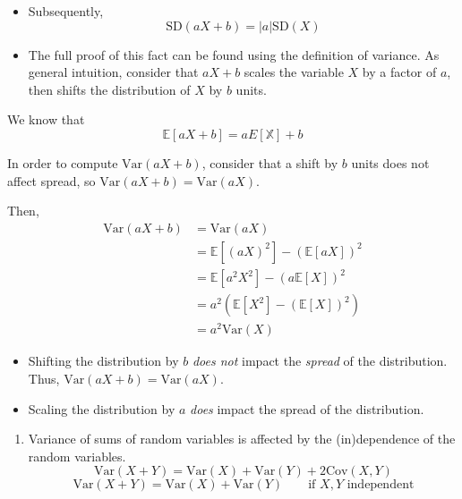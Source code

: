 \documentclass[
  letterpaper,
  DIV=11,
  numbers=noendperiod]{scrreprt}
\providecommand{\tightlist}{%
  \setlength{\itemsep}{0pt}\setlength{\parskip}{0pt}}\usepackage{longtable,booktabs,array}
\begin{document}
\begin{itemize}
\tightlist
\item
  Subsequently, \[\text{SD}(aX+b) = |a| \text{SD}(X)\]
\item
  The full proof of this fact can be found using the definition of
  variance. As general intuition, consider that \(aX+b\) scales the
  variable \(X\) by a factor of \(a\), then shifts the distribution of
  \(X\) by \(b\) units.
\end{itemize}

\begin{tcolorbox}[enhanced jigsaw, colback=white, arc=.35mm, toprule=.15mm, colframe=quarto-callout-tip-color-frame, coltitle=black, opacitybacktitle=0.6, breakable, titlerule=0mm, leftrule=.75mm, left=2mm, opacityback=0, bottomtitle=1mm, rightrule=.15mm, colbacktitle=quarto-callout-tip-color!10!white, bottomrule=.15mm, title=\textcolor{quarto-callout-tip-color}{\faLightbulb}\hspace{0.5em}{Proof}, toptitle=1mm]

We know that \[\mathbb{E}[aX+b] = aE[\mathbb{X}] + b\]

In order to compute \(\text{Var}(aX+b)\), consider that a shift by \(b\)
units does not affect spread, so \(\text{Var}(aX+b) = \text{Var}(aX)\).

Then, \[\begin{align}
    \text{Var}(aX+b) &= \text{Var}(aX) \\
    &= \mathbb{E}[(aX)^2] - (\mathbb{E}[aX])^2 \\
    &= \mathbb{E}[a^2 X^2] - (a\mathbb{E}[X])^2\\
    &= a^2 (\mathbb{E}[X^2] - (\mathbb{E}[X])^2) \\
    &= a^2 \text{Var}(X)
\end{align}\]

\end{tcolorbox}

\begin{itemize}
\tightlist
\item
  Shifting the distribution by \(b\) \emph{does not} impact the
  \emph{spread} of the distribution. Thus,
  \(\text{Var}(aX+b) = \text{Var}(aX)\).
\item
  Scaling the distribution by \(a\) \emph{does} impact the spread of the
  distribution.
\end{itemize}

\begin{enumerate}
\def\labelenumi{\arabic{enumi}.}
\setcounter{enumi}{1}
\tightlist
\item
  Variance of sums of random variables is affected by the (in)dependence
  of the random variables.
  \[\text{Var}(X + Y) = \text{Var}(X) + \text{Var}(Y) + 2\text{Cov}(X,Y)\]
  \[\text{Var}(X + Y) = \text{Var}(X) + \text{Var}(Y) \qquad \text{if } X, Y \text{ independent}\]
\end{enumerate}
\end{document}
